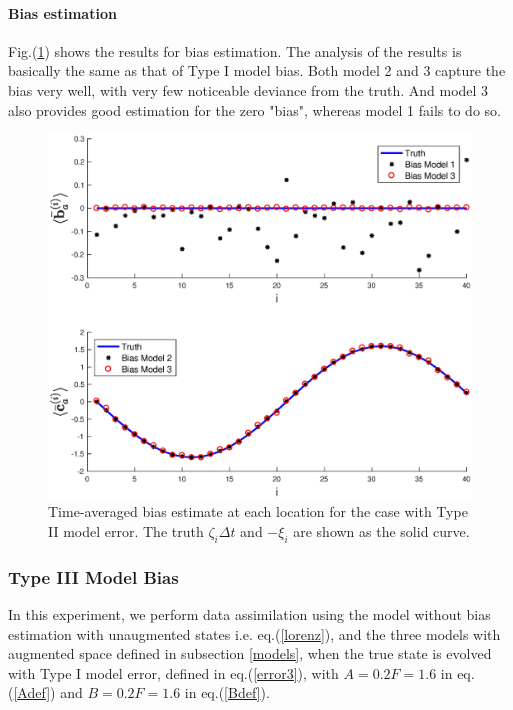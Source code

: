 \documentclass[twocolumn]{article}
\begin{document}
\paragraph{Bias estimation}
Fig.(\ref{BiasEstM2}) shows the results for bias estimation. The analysis of the results is basically the same as that of Type I model bias. Both model 2 and 3 capture the bias very well, with very few noticeable deviance from the truth. And model 3 also provides good estimation for the zero "bias", whereas model 1 fails to do so.
\begin{figure} 
\centering
\includegraphics[scale=0.3]{Figures/BiasEstM2}
\caption{Time-averaged bias estimate at each location for the case with Type II model error. The truth $\zeta_i\Delta t$ and $-\xi_i$ are shown as the solid curve.}
\label{BiasEstM2}
\end{figure}
\subsubsection{Type III Model Bias}
In this experiment, we perform data assimilation using the model without bias estimation with unaugmented states i.e. eq.(\ref{lorenz}), and the three models with augmented space defined in subsection \ref{models}, when the true state is evolved with Type I model error, defined in eq.(\ref{error3}), with $A=0.2F=1.6$ in eq.(\ref{Adef}) and $B=0.2F=1.6$ in eq.(\ref{Bdef}).
\end{document}
